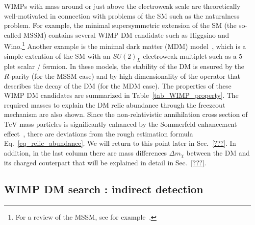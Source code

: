 \documentclass[12pt,twoside,book]{article}
\begin{document}
WIMPs with mass around or just above the electroweak scale are
theoretically well-motivated in connection with problems of the SM such
as the naturalness problem.  For example, the minimal supersymmetric
extension of the SM (the so-called MSSM) contains several WIMP DM
candidate such as Higgsino and Wino.\footnote{
For a review of the MSSM, see for example~\cite{Martin:1997ns}.
}
Another example is the minimal dark matter (MDM)
model~\cite{Cirelli:2005uq, Cirelli:2007xd, Cirelli:2009uv}, which is a
simple extention of the SM with an $SU(2)_L$ electroweak multiplet such
as a $5$-plet scalar / fermion.  In these models, the stability of the
DM is ensured by the $R$-parity (for the MSSM case) and by high
dimensionality of the operator that describes the decay of the DM (for
the MDM case).  The properties of these WIMP DM candidates are
summarized in Table~\ref{tab_WIMP_property}.  The required masses to
explain the DM relic abundance through the freezeout mechanism are also
shown.  Since the non-relativistic annihilation cross section of
$\mathrm{TeV}$ mass particles is significantly enhanced by the
Sommerfeld enhancement effect~\cite{Hisano:2004ds, Hisano:2006nn}, there
are deviations from the rough estimation formula
Eq.~\eqref{eq_relic_abundance}.  We will return to this point later in
Sec.~\ref{???}.    In addition, in the last column there
are mass differences $\Delta m_\chi$ between the DM and its charged
couterpart that will be explained in detail in Sec.~\ref{???}.

\subsection{WIMP DM search : indirect detection}



\end{document}
